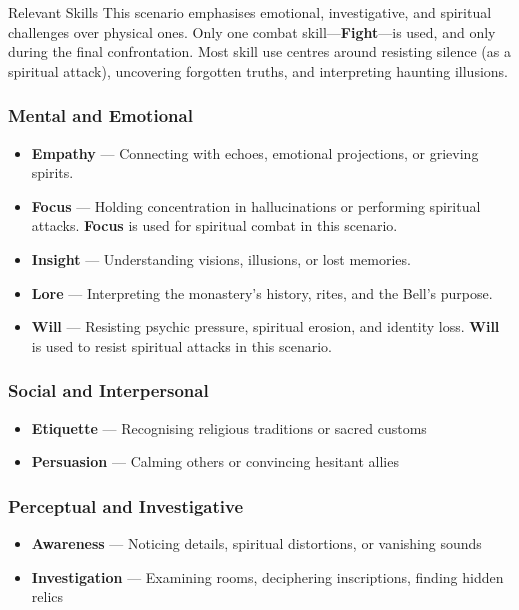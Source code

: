 \documentclass[twocolumn,nodeprecatedcode,bg=print]{dndbook/dndbook}
\begin{document}
\begin{WyrdSidebar}{Relevant Skills}
    This scenario emphasises emotional, investigative, and spiritual challenges over physical ones. Only one combat skill—\textbf{Fight}—is used, and only during the final confrontation. Most skill use centres around resisting silence (as a spiritual attack), uncovering forgotten truths, and interpreting haunting illusions.
    
    \vspace{0.5\baselineskip}
    
    \subsubsection*{Mental and Emotional}
    \begin{itemize}
        \item \textbf{Empathy} — Connecting with echoes, emotional projections, or grieving spirits.
        \item \textbf{Focus} — Holding concentration in hallucinations or performing spiritual attacks. \textbf{Focus} is used for spiritual combat in this scenario.
        \item \textbf{Insight} — Understanding visions, illusions, or lost memories.
        \item \textbf{Lore} — Interpreting the monastery’s history, rites, and the Bell’s purpose.
        \item \textbf{Will} — Resisting psychic pressure, spiritual erosion, and identity loss. \textbf{Will} is used to resist spiritual attacks in this scenario.
    \end{itemize}
    
    \subsubsection*{Social and Interpersonal}
    \begin{itemize}
        \item \textbf{Etiquette} — Recognising religious traditions or sacred customs
        \item \textbf{Persuasion} — Calming others or convincing hesitant allies
    \end{itemize}
    
    \subsubsection*{Perceptual and Investigative}
    \begin{itemize}
        \item \textbf{Awareness} — Noticing details, spiritual distortions, or vanishing sounds
        \item \textbf{Investigation} — Examining rooms, deciphering inscriptions, finding hidden relics
    \end{itemize}
    

\end{WyrdSidebar}
\end{document}
